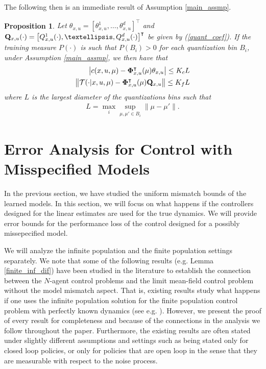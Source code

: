 \documentclass[twoside,11pt]{article}
\newtheorem{prop}{Proposition}[section]
\begin{document}
The following then is an immediate result of Assumption \ref{main_assmp}.
\begin{prop}
Let $\theta_{x,u} = [\theta^1_{x,u} , \dots, \theta^d_{x,u}]^\intercal$ and ${\bf Q}_{x,u}(\cdot) = \left[ Q^1_{x,u}(\cdot) ,\dots, Q^d_{x,u}(\cdot)\right]^\intercal$ be given by (\ref{quant_coef}). If the training measure $P(\cdot)$ is such that $P(B_i)>0$ for each quantization bin $B_i$, under Assumption \ref{main_assmp}, we then have that
\begin{align*}
\left| c(x,u,\mu) - {\bf \Phi}^\intercal_{x,u}(\mu) {\bf \theta}_{x,u}\right| \leq K_c L\\
 \left\| \mathcal{T} (\cdot |x,u,\mu) - {\bf \Phi}^\intercal_{x,u}(\mu) {\bf Q}_{x,u}\right\| \leq K_f L
\end{align*}
where $L$ is the largest diameter of the quantizations bins such that
\begin{align*}
L = \max_i \sup_{\mu,\mu' \in B_i} \|\mu-\mu'\|.
\end{align*}
\end{prop}


\section{Error Analysis for Control with Misspecified Models}\label{perf_loss}
In the previous section, we have studied the uniform mismatch bounds of the learned models. 
In this section, we will focus on what happens if the controllers designed for the linear estimates are used for the true dynamics. We will provide error bounds for  the performance loss of the control designed for a possibly missepecified model.

We will analyze the infinite population and the finite population settings separately. We note that some of the following results (e.g. Lemma \ref{finite_inf_dif}) have been studied in the literature to establish the connection between the $N$-agent control problems and the limit mean-field control problem without the model mismatch aspect. That is, existing results study
what happens if one uses the infinite population solution for the finite population control problem with perfectly known dynamics (see e.g. \cite{motte2022quantitative,bauerle2021mean,motte2022mean}). However, we present the proof of every result for completeness and because of the connections in the analysis we follow throughout the paper. Furthermore, the existing results are often stated under slightly different assumptions and settings such as being stated only for closed loop policies, or only for policies that are open loop in the sense that they are measurable with respect to the noise process.
\end{document}
